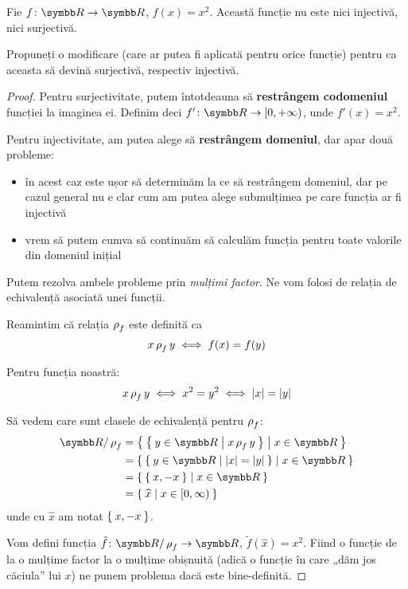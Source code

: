 \begin{exercise}
Fie \(\function{f}{\reals}{\reals}\), \(f(x) = x^2\). Această funcție nu este nici injectivă, nici surjectivă.

Propuneți o modificare (care ar putea fi aplicată pentru orice funcție) pentru ca aceasta să devină surjectivă, respectiv injectivă.
\end{exercise}
\begin{proof}
Pentru surjectivitate, putem întotdeauna să \textbf{restrângem codomeniul} funcției la imaginea ei. Definim deci \(\function{f'}{\reals}{[0, +\infty)}\), unde \(f'(x) = x^2\).

Pentru injectivitate, am putea alege să \textbf{restrângem domeniul}, dar apar două probleme:
\begin{itemize}
    \item în acest caz este ușor să determinăm la ce să restrângem domeniul, dar pe cazul general nu e clar cum am putea alege submulțimea pe care funcția ar fi injectivă
    \item vrem să putem cumva să continuăm să calculăm funcția pentru toate valorile din domeniul inițial
\end{itemize}
Putem rezolva ambele probleme prin \emph{mulțimi factor}. Ne vom folosi de relația de echivalență asociată unei funcții.

Reamintim că relația \(\operatorname{\rho}_f\) este definită ca
\[
    x \operatorname{\rho}_f y \iff f(x) = f(y)
\]

Pentru funcția noastră:
\[
    x \operatorname{\rho}_f y \iff x^2 = y^2 \iff \left\lvert x \right\rvert = \left\lvert y \right\rvert
\]

Să vedem care sunt clasele de echivalență pentru \(\operatorname{\rho}_f\):
\begin{align*}
    \reals/\rhoequiv_f &= \Set{ \Set{ y \in \reals | x \rhoequiv_f y } | x \in \reals } \\
        &= \Set{ \Set{ y \in \reals | \abs{x} = \abs{y} } | x \in \reals } \\
        &= \Set{ \Set{ x, -x } | x \in \reals } \\
        &= \Set{ \widehat{x} | x \in [0, \infty) }
\end{align*}
unde cu \(\widehat{x}\) am notat \(\Set{ x, -x }\).

Vom defini funcția \(\function{\tilde{f}}{\reals/\rhoequiv_f}{\reals}\), \(\tilde{f}(\widehat{x}) = x^2\). Fiind o funcție de la o mulțime factor la o mulțime obișnuită (adică o funcție în care „dăm jos căciula” lui \(x\)) ne punem problema dacă este bine-definită.


\end{proof}
